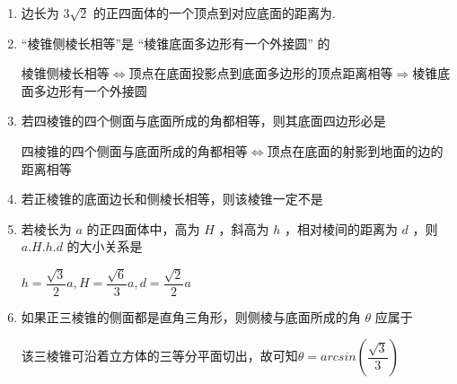 \begin{enumerate}
    \item 边长为 $3\sqrt{2}$ 的正四面体的一个顶点到对应底面的距离为.

    \item “棱锥侧棱长相等”是 “棱锥底面多边形有一个外接圆” 的 
    \begin{jieda}
        棱锥侧棱长相等$\Longleftrightarrow$顶点在底面投影点到底面多边形的顶点距离相等$\Longrightarrow$棱锥底面多边形有一个外接圆
    \end{jieda}
    
    \item 若四棱锥的四个侧面与底面所成的角都相等，则其底面四边形必是
    \begin{jieda}
        四棱锥的四个侧面与底面所成的角都相等$\Longleftrightarrow$顶点在底面的射影到地面的边的距离相等
    \end{jieda}

    \item 若正棱锥的底面边长和侧棱长相等，则该棱锥一定不是   
    
    \item 若棱长为 $a$ 的正四面体中，高为 ${H}$ ，斜高为 $h$ ，相对棱间的距离为 $d$ ，则 $a.{H}.h.d$ 的大小关系是  
    \begin{jieda}
        $h = \dfrac{\sqrt{3}}{2}a, H = \dfrac{\sqrt{6}}{3}a, d = \dfrac{\sqrt{2}}{2}a$
    \end{jieda}
    
    \item 如果正三棱锥的侧面都是直角三角形，则侧棱与底面所成的角 $\theta$ 应属于  
    
    \begin{jieda}
        该三棱锥可沿着立方体的三等分平面切出，故可知$\theta = arcsin\left(\dfrac{\sqrt{3}}{3}\right)$
    \end{jieda}
\end{enumerate}
